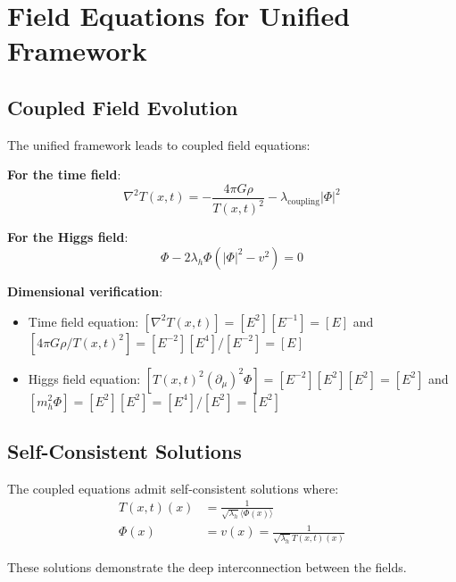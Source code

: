 \documentclass[12pt,a4paper]{article}
\newcommand{\Tfieldt}{T(x,t)}
\begin{document}
	\section{Field Equations for Unified Framework}
	\label{sec:unified_field_equations}
	
	\subsection{Coupled Field Evolution}
	\label{subsec:coupled_evolution}
	
	The unified framework leads to coupled field equations:
	
	\textbf{For the time field}:
	\begin{equation}
		\nabla^2 \Tfieldt = -\frac{4\pi G \rho}{\Tfieldt^2} - \lambda_{\text{coupling}}|\Phi|^2
		\label{eq:time_field_equation}
	\end{equation}
	
	\textbf{For the Higgs field}:
	\begin{equation}
		[\Tfieldt^2 (\partial_\mu + ig A_\mu)^2 + m_h^2]\Phi - 2\lambda_h\Phi(|\Phi|^2 - v^2) = 0
		\label{eq:higgs_field_equation}
	\end{equation}
	
	\textbf{Dimensional verification}:
	\begin{itemize}
		\item Time field equation: $[\nabla^2 \Tfieldt] = [E^2][E^{-1}] = [E]$ and $[4\pi G \rho/\Tfieldt^2] = [E^{-2}][E^4]/[E^{-2}] = [E]$ \checkmark
		\item Higgs field equation: $[\Tfieldt^2 (\partial_\mu)^2 \Phi] = [E^{-2}][E^2][E^2] = [E^2]$ and $[m_h^2 \Phi] = [E^2][E^2] = [E^4]/[E^2] = [E^2]$ \checkmark
	\end{itemize}
	
	\subsection{Self-Consistent Solutions}
	\label{subsec:self_consistent_solutions}
	
	The coupled equations admit self-consistent solutions where:
	\begin{align}
		\Tfieldt(x) &= \frac{1}{\sqrt{\lambda_h}\langle\Phi(x)\rangle} \\
		\Phi(x) &= v(x) = \frac{1}{\sqrt{\lambda_h}\Tfieldt(x)}
		\label{eq:self_consistent_solutions}
	\end{align}
	
	These solutions demonstrate the deep interconnection between the fields.
	
\end{document}

